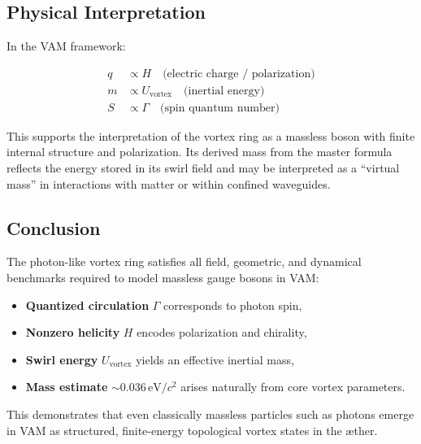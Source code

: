\subsection{Physical Interpretation}

In the VAM framework:

\begin{align*}
q &\propto H \quad \text{(electric charge / polarization)} \\
m &\propto U_{\text{vortex}} \quad \text{(inertial energy)} \\
S &\propto \Gamma \quad \text{(spin quantum number)}
\end{align*}

This supports the interpretation of the vortex ring as a massless boson with finite internal structure and polarization. Its derived mass from the master formula reflects the energy stored in its swirl field and may be interpreted as a “virtual mass” in interactions with matter or within confined waveguides.

\subsection{Conclusion}

The photon-like vortex ring satisfies all field, geometric, and dynamical benchmarks required to model massless gauge bosons in VAM:

\begin{itemize}
    \item \textbf{Quantized circulation} $\Gamma$ corresponds to photon spin,
    \item \textbf{Nonzero helicity} $H$ encodes polarization and chirality,
    \item \textbf{Swirl energy} $U_{\text{vortex}}$ yields an effective inertial mass,
    \item \textbf{Mass estimate} \(\sim 0.036 \, \text{eV}/c^2\) arises naturally from core vortex parameters.
\end{itemize}

This demonstrates that even classically massless particles such as photons emerge in VAM as structured, finite-energy topological vortex states in the æther.
